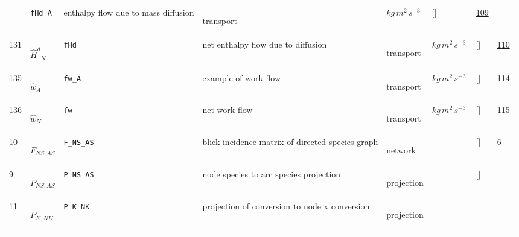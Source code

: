 \begin{longtable}{|p{1cm}|p{3cm}|p{3cm}|p{7cm}|p{3.0cm}|p{3cm}|p{2cm}|p{1cm}|}
             & \verb|fHd_A|
             & enthalpy flow due to mass diffusion
             & \begin{lay}transport \end{lay}
             & $ kg \,m^{2} \,s^{-3} \, $
             & []
             & \hyperlink{"e:109"}{ 109 }
                 \\
    131
             & \hypertarget{"v:131"}{ $ {\hat{H}^{d}}_{N} $}
             & \verb|fHd|
             & net enthalpy flow due to diffusion
             & \begin{lay}transport \end{lay}
             & $ kg \,m^{2} \,s^{-3} \, $
             & []
             & \hyperlink{"e:110"}{ 110 }
                 \\
    135
             & \hypertarget{"v:135"}{ $ {\hat{w}}_{A} $}
             & \verb|fw_A|
             & example of work flow
             & \begin{lay}transport \end{lay}
             & $ kg \,m^{2} \,s^{-3} \, $
             & []
             & \hyperlink{"e:114"}{ 114 }
                 \\
    136
             & \hypertarget{"v:136"}{ $ {\hat{w}}_{N} $}
             & \verb|fw|
             & net work flow
             & \begin{lay}transport \end{lay}
             & $ kg \,m^{2} \,s^{-3} \, $
             & []
             & \hyperlink{"e:115"}{ 115 }
                 \\
    10
             & \hypertarget{"v:10"}{ $ {F}_{{N S}, {A S}} $}
             & \verb|F_NS_AS|
             & blick incidence matrix of directed species graph
             & \begin{lay}network \end{lay}
             & $  $
             & []
             & \hyperlink{"e:6"}{ 6 }
                 \\
    9
             & \hypertarget{"v:9"}{ $ {P}_{{N S}, {A S}} $}
             & \verb|P_NS_AS|
             & node species to arc species projection
             & \begin{lay}projection \end{lay}
             & $  $
             & []
             & \\
    11
             & \hypertarget{"v:11"}{ $ {P}_{K, {N K}} $}
             & \verb|P_K_NK|
             & projection of conversion to node x conversion
             & \begin{lay}projection \end{lay}

\end{longtable}
